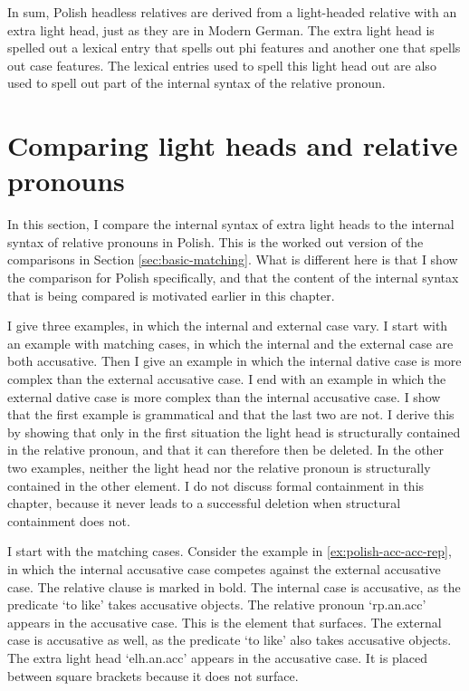 In sum, Polish headless relatives are derived from a light-headed relative with an extra light head, just as they are in Modern German. The extra light head is spelled out a lexical entry that spells out phi features and another one that spells out case features. The lexical entries used to spell this light head out are also used to spell out part of the internal syntax of the relative pronoun.


\section{Comparing light heads and relative pronouns}\label{sec:comparing-polish}

In this section, I compare the internal syntax of extra light heads to the internal syntax of relative pronouns in Polish. This is the worked out version of the comparisons in Section \ref{sec:basic-matching}. What is different here is that I show the comparison for Polish specifically, and that the content of the internal syntax that is being compared is motivated earlier in this chapter.

I give three examples, in which the internal and external case vary.
I start with an example with matching cases, in which the internal and the external case are both accusative.
Then I give an example in which the internal dative case is more complex than the external accusative case.
I end with an example in which the external dative case is more complex than the internal accusative case.
I show that the first example is grammatical and that the last two are not. I derive this by showing that only in the first situation the light head is structurally contained in the relative pronoun, and that it can therefore then be deleted.
In the other two examples, neither the light head nor the relative pronoun is structurally contained in the other element.
I do not discuss formal containment in this chapter, because it never leads to a successful deletion when structural containment does not.

I start with the matching cases.
Consider the example in \ref{ex:polish-acc-acc-rep}, in which the internal accusative case competes against the external accusative case. The relative clause is marked in bold.
The internal case is accusative, as the predicate  `to like' takes accusative objects. The relative pronoun  `\ac{rp}.\ac{an}.\ac{acc}' appears in the accusative case. This is the element that surfaces.
The external case is accusative as well, as the predicate  `to like' also takes accusative objects. The extra light head  `\ac{elh}.\ac{an}.\ac{acc}' appears in the accusative case. It is placed between square brackets because it does not surface.

